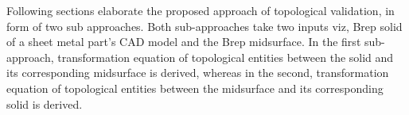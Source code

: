 Following sections elaborate the proposed approach of topological validation, in form of two sub approaches. Both sub-approaches take two inputs viz,  Brep solid of a sheet metal part's CAD model and the Brep midsurface. In the first sub-approach, transformation equation of topological entities between the solid and its corresponding midsurface is derived, whereas in the second, transformation equation of topological entities between the midsurface and its corresponding solid is derived.

%






